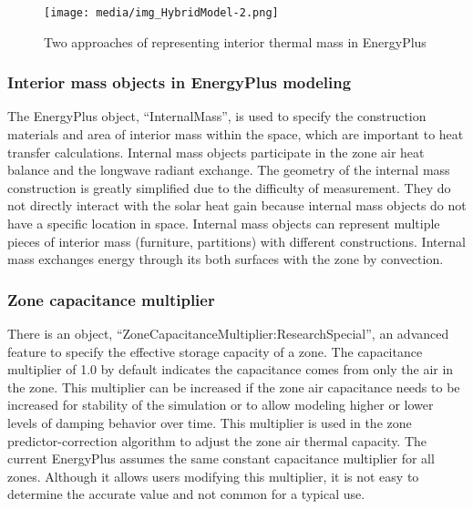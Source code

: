 \documentclass[11pt]{article}
\begin{document}
\begin{figure}[h]
\begin{center}
\texttt{[image: media/img\_HybridModel-2.png]}
\caption{Two approaches of representing interior thermal mass in EnergyPlus}\protect \label{fig:two-approaches-of-representing-interior-thermal-mass-in-EnergyPlus}
\end{center}
\end{figure}

\subsubsection{Interior mass objects in EnergyPlus modeling}\label{interior-mass-objects-in-EnergyPlus-modeling}

The EnergyPlus object, ``InternalMass'', is used to specify the construction materials and area of interior mass within the space, which are important to heat transfer calculations. Internal mass objects participate in the zone air heat balance and the longwave radiant exchange. The geometry of the internal mass construction is greatly simplified due to the difficulty of measurement. They do not directly interact with the solar heat gain because internal mass objects do not have a specific location in space. Internal mass objects can represent multiple pieces of interior mass (furniture, partitions) with different constructions. Internal mass exchanges energy through its both surfaces with the zone by convection. 

\subsubsection{Zone capacitance multiplier}\label{zone-capacitance-multiplier}

There is an object, ``ZoneCapacitanceMultiplier:ResearchSpecial'', an advanced feature to specify the effective storage capacity of a zone. The capacitance multiplier of 1.0 by default indicates the capacitance comes from only the air in the zone. This multiplier can be increased if the zone air capacitance needs to be increased for stability of the simulation or to allow modeling higher or lower levels of damping behavior over time. This multiplier is used in the zone predictor-correction algorithm to adjust the zone air thermal capacity. The current EnergyPlus assumes the same constant capacitance multiplier for all zones. Although it allows users modifying this multiplier, it is not easy to determine the accurate value and not common for a typical use.
\end{document}
